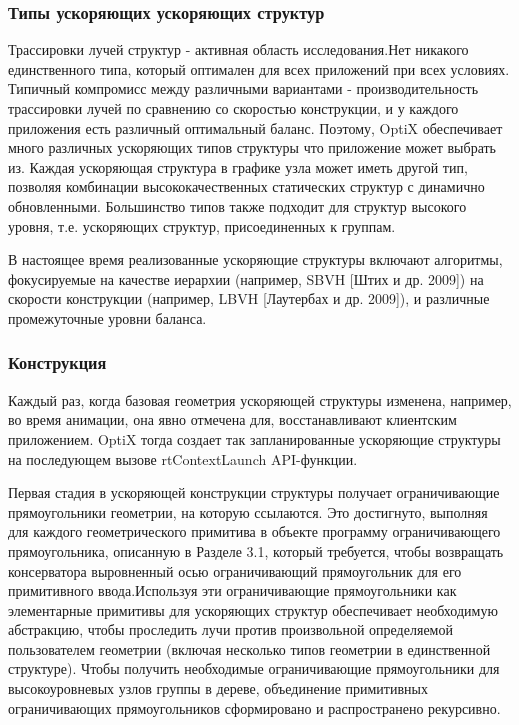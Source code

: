 \subsubsection{Типы ускоряющих ускоряющих структур}
 Трассировки лучей структур - активная область исследования.Нет никакого единственного типа, который оптимален для всех приложений при всех условиях. Типичный компромисс между различными вариантами - производительность трассировки лучей по сравнению со скоростью конструкции, и у каждого приложения есть различный оптимальный баланс. Поэтому, OptiX обеспечивает много различных ускоряющих типов структуры что приложение может выбрать из. Каждая ускоряющая структура в графике узла может иметь другой тип, позволяя комбинации высококачественных статических структур с динамично обновленными. Большинство типов также подходит для структур высокого уровня, т.е. ускоряющих структур, присоединенных к группам.

В настоящее время реализованные ускоряющие структуры включают алгоритмы, фокусируемые на качестве иерархии (например, SBVH [Штих и др. 2009]) на скорости конструкции (например, LBVH [Лаутербах и др. 2009]), и различные промежуточные уровни баланса.
\subsubsection{Конструкция}
Каждый раз, когда базовая геометрия ускоряющей структуры изменена, например, во время анимации, она явно отмечена для, восстанавливают клиентским приложением. OptiX тогда создает так запланированные ускоряющие структуры на последующем вызове rtContextLaunch API-функции. 

Первая стадия в ускоряющей конструкции структуры получает ограничивающие прямоугольники геометрии, на которую ссылаются. Это достигнуто, выполняя для каждого геометрического примитива в объекте программу ограничивающего прямоугольника, описанную в Разделе 3.1, который требуется, чтобы возвращать консерватора выровненный осью ограничивающий прямоугольник для его примитивного ввода.Используя эти ограничивающие прямоугольники как элементарные примитивы для ускоряющих структур обеспечивает необходимую абстракцию, чтобы проследить лучи против произвольной определяемой пользователем геометрии (включая несколько типов геометрии в единственной структуре). Чтобы получить необходимые ограничивающие прямоугольники для высокоуровневых узлов группы в дереве, объединение примитивных ограничивающих прямоугольников сформировано и распространено рекурсивно.

